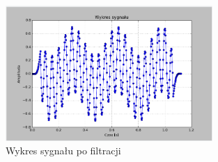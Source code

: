 \documentclass{article}
\begin{document}
{{            \begin{figure}[h!]
                \centering
                \includegraphics[width=0.7\textwidth]{img/fil20.png}
                \caption{Wykres sygnału po filtracji}
            \end{figure}
            \FloatBarrier
        }
        \newpage

}
\end{document}
